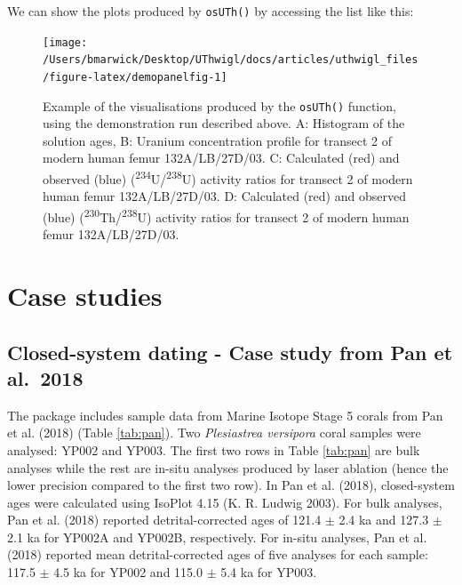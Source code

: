 \documentclass[]{elsarticle} %
\newenvironment{Shaded}{\begin{snugshade}}{\end{snugshade}}
\newcommand{\NormalTok}[1]{#1}
\newcommand{\OperatorTok}[1]{\textcolor[rgb]{0.81,0.36,0.00}{\textbf{#1}}}
\begin{document}
We can show the plots produced by \texttt{osUTh()} by accessing the list like this:



\begin{Shaded}
\end{Shaded}

\begin{figure}
\texttt{[image: /Users/bmarwick/Desktop/UThwigl/docs/articles/uthwigl\_files/figure-latex/demopanelfig-1]} \caption{Example of the visualisations produced by the \texttt{osUTh()} function, using the demonstration run described above. A: Histogram of the solution ages, B: Uranium concentration profile for transect 2 of modern human femur 132A/LB/27D/03. C: Calculated (red) and observed (blue) (\textsuperscript{234}U/\textsuperscript{238}U) activity ratios for transect 2 of modern human femur 132A/LB/27D/03. D: Calculated (red) and observed (blue) (\textsuperscript{230}Th/\textsuperscript{238}U) activity ratios for transect 2 of modern human femur 132A/LB/27D/03.}\label{fig:demopanelfig}
\end{figure}

\FloatBarrier

\newpage

\hypertarget{case-studies}{%
\section{Case studies}\label{case-studies}}

\hypertarget{closed-system-dating---case-study-from-pan-et-al.-2018}{%
\subsection{Closed-system dating - Case study from Pan et al.~2018}\label{closed-system-dating---case-study-from-pan-et-al.-2018}}

The package includes sample data from Marine Isotope Stage 5 corals from Pan et al. (2018) (Table \ref{tab:pan}). Two \emph{Plesiastrea versipora} coral samples were analysed: YP002 and YP003. The first two rows in Table \ref{tab:pan} are bulk analyses while the rest are in-situ analyses produced by laser ablation (hence the lower precision compared to the first two row).
In Pan et al. (2018), closed-system ages were calculated using IsoPlot 4.15 (K. R. Ludwig 2003). For bulk analyses, Pan et al. (2018) reported detrital-corrected ages of 121.4 \(\pm\) 2.4 ka and 127.3 \(\pm\) 2.1 ka for YP002A and YP002B, respectively. For in-situ analyses, Pan et al. (2018) reported mean detrital-corrected ages of five analyses for each sample: 117.5 \(\pm\) 4.5 ka for YP002 and 115.0 \(\pm\) 5.4 ka for YP003.
\end{document}
